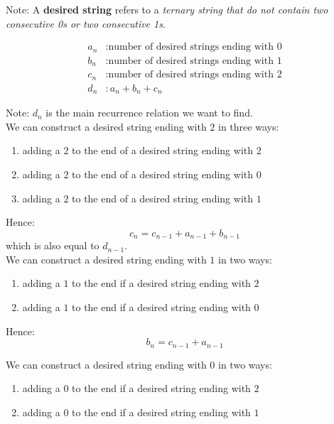 \documentclass[12pt]{article}
\begin{document}
Note: A \textbf{desired string} refers to a \textit{ternary string that do not contain two consecutive 0s or two consecutive 1s}.

\begin{align*}
a_n &: \text{number of desired strings ending with 0} \\
b_n &: \text{number of desired strings ending with 1} \\
c_n &: \text{number of desired strings ending with 2} \\
d_n &: a_n+b_n+c_n
\end{align*}

Note: $d_n$ is the main recurrence relation we want to find.\\

We can construct a desired string ending with $2$ in three ways:
\begin{enumerate}[label=\roman*]
\item
adding a $2$ to the end of a desired string ending with $2$
\item
adding a $2$ to the end of a desired string ending with $0$
\item
adding a $2$ to the end of a desired string ending with $1$
\end{enumerate}

Hence:
\begin{equation} c_n = c_{n-1}+a_{n-1}+b_{n-1} \end{equation}
which is also equal to $d_{n-1}$.\\

We can construct a desired string ending with $1$ in two ways:
\begin{enumerate}[label=\roman*]
\item
adding a $1$ to the end if a desired string ending with $2$
\item
adding a $1$ to the end if a desired string ending with $0$
\end{enumerate}

Hence:
\begin{equation} b_n=c_{n-1}+a_{n-1} \end{equation}

We can construct a desired string ending with $0$ in two ways:
\begin{enumerate}[label=\roman*]
\item
adding a $0$ to the end if a desired string ending with $2$
\item
adding a $0$ to the end if a desired string ending with $1$
\end{enumerate}
\end{document}

